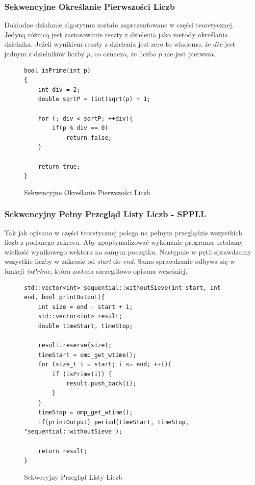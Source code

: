 \documentclass{article}
\begin{document}
            \subsubsection{Sekwencyjne Określanie Pierwszości Liczb}
                Dokładne działanie algorytmu zostało zaprezentowane w części teoretycznej. Jedyną różnicą jest zastosowanie reszty z dzielenia jako metody określania dzielnika. Jeżeli wynikiem reszty z dzielenia jest zero to wiadomo, że $div$ jest jednym z dzielników liczby $p$, co oznacza, że liczba $p$ nie jest pierwsza.
                \begin{figure}[H]
                    \begin{verbatim}
bool isPrime(int p)
{
	int div = 2;
	double sqrtP = (int)sqrt(p) + 1;

	for (; div < sqrtP; ++div){ 
		if(p % div == 0) 
			return false;
	}

	return true;
}
                    \end{verbatim}
                    \caption{Sekwencyjne Określanie Pierwszości Liczb}
                \end{figure}
                
            \subsubsection{Sekwencyjny Pełny Przegląd Listy Liczb - \gls{SPPLL}}
            Tak jak opisano w części teoretycznej polega na pełnym przeglądzie wszystkich liczb z podanego zakresu. Aby zpoptymalizować wykonanie programu ustalamy wielkość wynikowego wektora na samym początku. Następnie w pętli sprawdzamy wszystkie liczby w zakresie od \emph{start} do \emph{end}. Samo sprawdzanie odbywa się w funkcji \emph{isPrime}, która została szczególowo opisana wcześniej.
                \begin{figure}[H]
                    \begin{verbatim}
std::vector<int> sequential::withoutSieve(int start, int end, bool printOutput){
    int size = end - start + 1;
    std::vector<int> result;
    double timeStart, timeStop;
                
    result.reserve(size);
    timeStart = omp_get_wtime();
    for (size_t i = start; i <= end; ++i){
        if (isPrime(i)) {
            result.push_back(i);
        }
    }
    timeStop = omp_get_wtime();
    if(printOutput) period(timeStart, timeStop, "sequential::withoutSieve");
                
    return result;
}
                    \end{verbatim}
                    \caption{Sekwecyjny Przegląd Listy Liczb}
                \end{figure}
                
\end{document}
